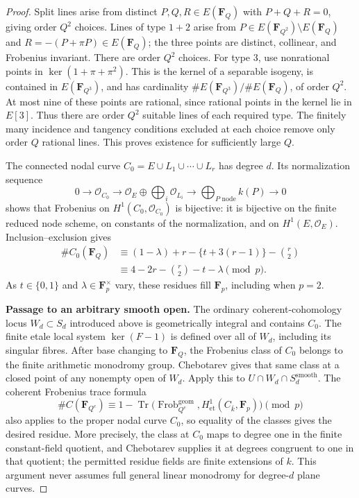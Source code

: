 \begin{proof}
Split lines arise from distinct $P,Q,R\in E(\mathbf F_Q)$ with
$P+Q+R=0$, giving order $Q^2$ choices.  Lines of type $1+2$ arise from
$P\in E(\mathbf F_{Q^2})\setminus E(\mathbf F_Q)$ and
$R=-(P+\pi P)\in E(\mathbf F_Q)$; the three points are distinct,
collinear, and Frobenius invariant.  There are order $Q^2$ choices.
For type $3$, use nonrational points in
$\ker(1+\pi+\pi^2)$.  This is the kernel of a separable isogeny,
is contained in $E(\mathbf F_{Q^3})$, and has cardinality
$\#E(\mathbf F_{Q^3})/\#E(\mathbf F_Q)$, of order $Q^2$.
At most nine of these points are rational, since rational points in
the kernel lie in $E[3]$.  Thus there are order $Q^2$ suitable lines
of each required type.  The finitely many incidence and tangency
conditions excluded at each choice remove only order $Q$ rational
lines.  This proves existence for sufficiently large $Q$.

The connected nodal curve
$C_0=E\cup L_1\cup\cdots\cup L_r$ has degree $d$.
Its normalization sequence
\[
0\longrightarrow\mathcal O_{C_0}\longrightarrow
\mathcal O_E\oplus\bigoplus_i\mathcal O_{L_i}
\longrightarrow\bigoplus_{P\text{ node}}k(P)\longrightarrow0
\]
shows that Frobenius on $H^1(C_0,\mathcal O_{C_0})$ is bijective:
it is bijective on the finite reduced node scheme, on constants of
the normalization, and on $H^1(E,\mathcal O_E)$.
Inclusion--exclusion gives
\begin{align*}
 \#C_0(\mathbf F_Q)
 &\equiv (1-\lambda)+r-\{t+3(r-1)\}-\binom r2\\
 &\equiv 4-2r-\binom r2-t-\lambda\pmod p.
\end{align*}
As $t\in\{0,1\}$ and $\lambda\in\mathbf F_p^\times$ vary, these
residues fill $\mathbf F_p$, including when $p=2$.

\par\smallskip\noindent\textbf{Passage to an arbitrary smooth open.}
The ordinary coherent-cohomology locus $W_d\subset S_d$ introduced
above is geometrically integral and contains $C_0$.
The finite etale local system $\ker(F-1)$ is defined over all of $W_d$,
including its singular fibres.  After base changing to $\mathbf F_Q$,
the Frobenius class of $C_0$ belongs to the finite arithmetic
monodromy group.  Chebotarev gives that same class at a closed point
of any nonempty open of $W_d$.  Apply this to
$U\cap W_d\cap S_d^{\mathrm{smooth}}$.
The coherent Frobenius trace formula
\[
 \#C(\mathbf F_{Q^e})\equiv
 1-\operatorname{Tr}\bigl(\operatorname{Frob}_{Q^e}^{\mathrm{geom}},
 H^1_{\mathrm{et}}(C_{\bar k},\mathbf F_p)\bigr)\pmod p
\]
also applies to the proper nodal curve $C_0$, so equality of the
classes gives the desired residue.  More precisely, the class at
$C_0$ maps to degree one in the finite constant-field quotient, and
Chebotarev supplies it at degrees congruent to one in that quotient;
the permitted residue fields are finite extensions of $k$.
This argument never assumes full general linear monodromy for
degree-$d$ plane curves.
\end{proof}

